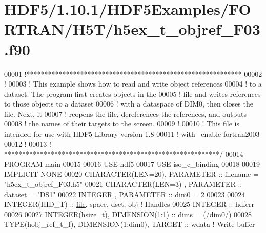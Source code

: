 \hypertarget{_h_d_f5_21_810_81_2_h_d_f5_examples_2_f_o_r_t_r_a_n_2_h5_t_2h5ex__t__objref___f03_8f90_source}{}\section{H\+D\+F5/1.10.1/\+H\+D\+F5\+Examples/\+F\+O\+R\+T\+R\+A\+N/\+H5\+T/h5ex\+\_\+t\+\_\+objref\+\_\+\+F03.f90}
\label{_h_d_f5_21_810_81_2_h_d_f5_examples_2_f_o_r_t_r_a_n_2_h5_t_2h5ex__t__objref___f03_8f90_source}

\begin{DoxyCode}
00001 \textcolor{comment}{!************************************************************}
00002 \textcolor{comment}{!}
00003 \textcolor{comment}{!  This example shows how to read and write object references}
00004 \textcolor{comment}{!  to a dataset.  The program first creates objects in the}
00005 \textcolor{comment}{!  file and writes references to those objects to a dataset}
00006 \textcolor{comment}{!  with a dataspace of DIM0, then closes the file.  Next, it}
00007 \textcolor{comment}{!  reopens the file, dereferences the references, and outputs}
00008 \textcolor{comment}{!  the names of their targets to the screen.}
00009 \textcolor{comment}{!}
00010 \textcolor{comment}{!  This file is intended for use with HDF5 Library version 1.8}
00011 \textcolor{comment}{!  with --enable-fortran2003}
00012 \textcolor{comment}{!}
00013 \textcolor{comment}{! ************************************************************/}
00014 \textcolor{keyword}{PROGRAM} main
00015 
00016   \textcolor{keywordtype}{USE }hdf5
00017   \textcolor{keywordtype}{USE }iso\_c\_binding
00018 
00019   \textcolor{keywordtype}{IMPLICIT NONE}
00020   \textcolor{keywordtype}{CHARACTER(LEN=20)}, \textcolor{keywordtype}{PARAMETER} :: filename  = \textcolor{stringliteral}{"h5ex\_t\_objref\_F03.h5"}
00021   \textcolor{keywordtype}{CHARACTER(LEN=3)} , \textcolor{keywordtype}{PARAMETER} :: dataset   = \textcolor{stringliteral}{"DS1"}
00022   \textcolor{keywordtype}{INTEGER}          , \textcolor{keywordtype}{PARAMETER} :: dim0      = 2
00023 
00024   \textcolor{keywordtype}{INTEGER(HID\_T)}  :: \hyperlink{structfile}{file}, space, dset, obj \textcolor{comment}{! Handles}
00025   \textcolor{keywordtype}{INTEGER} :: hdferr
00026 
00027   \textcolor{keywordtype}{INTEGER(hsize\_t)},   \textcolor{keywordtype}{DIMENSION(1:1)} :: dims = (/dim0/)
00028   \textcolor{keywordtype}{TYPE}(hobj\_ref\_t\_f), \textcolor{keywordtype}{DIMENSION(1:dim0)}, \textcolor{keywordtype}{TARGET} :: wdata \textcolor{comment}{! Write buffer}

\end{DoxyCode}
